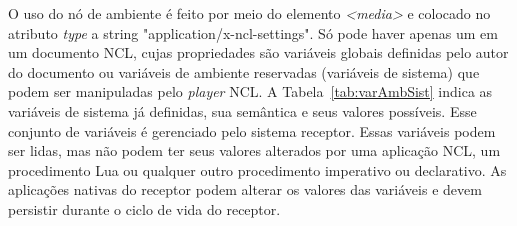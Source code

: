 O uso do nó de ambiente é feito por meio do elemento \textit{<media>} e colocado no atributo \textit{type} a string "application/x-ncl-settings". Só pode haver apenas um em um documento NCL, cujas propriedades são variáveis globais definidas pelo autor do documento ou variáveis de ambiente reservadas (variáveis de sistema) que podem ser manipuladas pelo \textit{player} NCL. A Tabela~\ref{tab:varAmbSist} indica as variáveis de sistema já definidas, sua semântica e seus valores possíveis. Esse conjunto de variáveis é gerenciado pelo sistema receptor. Essas variáveis podem ser lidas, mas não podem ter seus valores alterados por uma aplicação NCL, um procedimento Lua ou qualquer outro procedimento imperativo ou declarativo. As aplicações nativas do receptor podem alterar os valores das variáveis e devem persistir durante o ciclo de vida do receptor.

